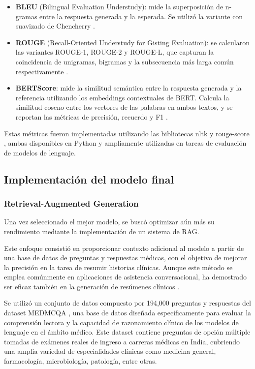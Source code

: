 \documentclass[../main.tex]{subfiles}
\begin{document}
	\begin{itemize}
		\item \textbf{BLEU} (Bilingual Evaluation Understudy): mide la superposición de n-gramas entre la respuesta generada y la esperada. Se utilizó la variante con suavizado de Chencherry \parencite{papineni-etal-2002-bleu}.
		\item \textbf{ROUGE} (Recall-Oriented Understudy for Gisting Evaluation): se calcularon las variantes ROUGE-1, ROUGE-2 y ROUGE-L, que capturan la coincidencia de unigramas, bigramas y la subsecuencia más larga común respectivamente \parencite{lin-2004-rouge}.
		\item \textbf{BERTScore}: mide la similitud semántica entre la respuesta generada y la referencia utilizando los embeddings contextuales de BERT. Calcula la similitud coseno entre los vectores de las palabras en ambos textos, y se reportan las métricas de precisión, recuerdo y F1 \parencite{zhang2020bertscoreevaluatingtextgeneration}.
		
	\end{itemize}
	
Estas métricas fueron implementadas utilizando las bibliotecas nltk \parencite{loper2002nltknaturallanguagetoolkit} y rouge-score \parencite{rouge_score}, ambas disponibles en Python y ampliamente utilizadas en tareas de evaluación de modelos de lenguaje.



\subsection{Implementación del modelo final}
\subsubsection{Retrieval-Augmented Generation}

Una vez seleccionado el mejor modelo, se buscó optimizar aún más su rendimiento mediante la implementación de un sistema de RAG.

Este enfoque consistió en proporcionar contexto adicional al modelo a partir de una base de datos de preguntas y respuestas médicas, con el objetivo de mejorar la precisión en la tarea de resumir historias clínicas. Aunque este método se emplea comúnmente en aplicaciones de asistencia conversacional, ha demostrado ser eficaz también en la generación de resúmenes clínicos \parencite{ALKHALAF2024104662}.

Se utilizó un conjunto de datos compuesto por 194,000 preguntas y respuestas del dataset MEDMCQA \parencite{pmlr-v174-pal22a}, una base de datos diseñada específicamente para evaluar la comprensión lectora y la capacidad de razonamiento clínico de los modelos de lenguaje en el ámbito médico. Este dataset contiene preguntas de opción múltiple tomadas de exámenes reales de ingreso a carreras médicas en India, cubriendo una amplia variedad de especialidades clínicas como medicina general, farmacología, microbiología, patología, entre otras.
\end{document}
